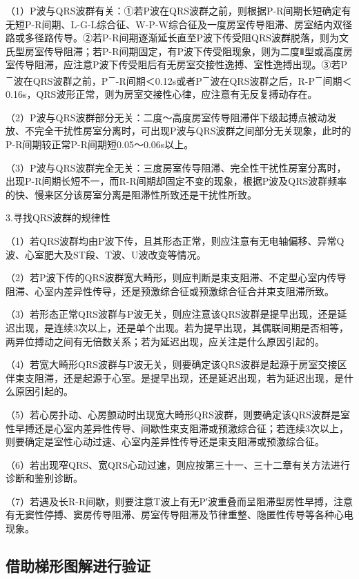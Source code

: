 （1）P波与QRS波群有关：①若P波在QRS波群之前，则根据P-R间期长短确定有无短P-R间期、L-G-L综合征、W-P-W综合征及一度房室传导阻滞、房室结内双径路或多径路传导。②若P-R间期逐渐延长直至P波下传受阻QRS波群脱落，则为文氏型房室传导阻滞；若P-R间期固定，有P波下传受阻现象，则为二度Ⅱ型或高度房室传导阻滞，应注意P波下传受阻后有无房室交接性逸搏、室性逸搏出现。③若P\textsuperscript{－}波在QRS波群之前，P\textsuperscript{－}-R间期＜0.12s或者P\textsuperscript{－}波在QRS波群之后，R-P\textsuperscript{－}间期＜0.16s，QRS波形正常，则为房室交接性心律，应注意有无反复搏动存在。

（2）P波与QRS波群部分无关：二度～高度房室传导阻滞伴下级起搏点被动发放、不完全干扰性房室分离时，可出现P波与QRS波群之间部分无关现象，此时的P-R间期较正常P-R间期短0.05～0.06s以上。

（3）P波与QRS波群完全无关：三度房室传导阻滞、完全性干扰性房室分离时，出现P-R间期长短不一，而R-R间期却固定不变的现象，根据P波及QRS波群频率的快、慢来区分该房室分离是阻滞性所致还是干扰性所致。

3.寻找QRS波群的规律性

（1）若QRS波群均由P波下传，且其形态正常，则应注意有无电轴偏移、异常Q波、心室肥大及ST段、T波、U波改变等情况。

（2）若P波下传的QRS波群宽大畸形，则应判断是束支阻滞、不定型心室内传导阻滞、心室内差异性传导，还是预激综合征或预激综合征合并束支阻滞所致。

（3）若形态正常QRS波群与P波无关，则应注意该QRS波群是提早出现，还是延迟出现，是连续3次以上，还是单个出现。若为提早出现，其偶联间期是否相等，两异位搏动之间有无倍数关系；若为延迟出现，应关注是什么原因引起的。

（4）若宽大畸形QRS波群与P波无关，则要确定该QRS波群是起源于房室交接区伴束支阻滞，还是起源于心室。是提早出现，还是延迟出现，若为延迟出现，是什么原因引起的。

（5）若心房扑动、心房颤动时出现宽大畸形QRS波群，则要确定该QRS波群是室性早搏还是心室内差异性传导、间歇性束支阻滞或预激综合征；若连续3次以上，则要确定是室性心动过速、心室内差异性传导还是束支阻滞或预激综合征。

（6）若出现窄QRS、宽QRS心动过速，则应按第三十一、三十二章有关方法进行诊断和鉴别诊断。

（7）若遇及长R-R间歇，则要注意T波上有无P′波重叠而呈阻滞型房性早搏，注意有无窦性停搏、窦房传导阻滞、房室传导阻滞及节律重整、隐匿性传导等各种心电现象。

\protect\hypertarget{text00016.htmlux5cux23subid118}{}{}

\subsection{借助梯形图解进行验证}

